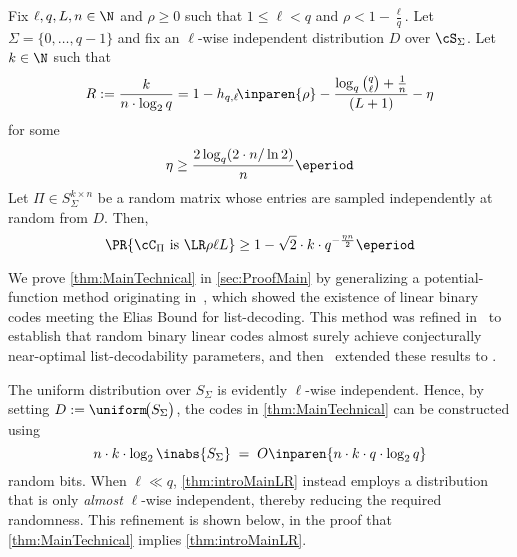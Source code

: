 \documentclass[11pt]{article}
\begin{document}
\begin{theorem}\label{thm:MainTechnical}
    Fix $\ell, q,L, n\in \N$ and $\rho \ge 0$ such that $1\le \ell < q$ and $\rho < 1-\frac \ell q$. Let $\Sigma = \{0,\dots, q-1\}$ and fix an $\ell$-wise independent distribution $D$ over $\cS_\Sigma$. Let $k\in \N$ such that $$R:= \frac{k}{n\cdot \log_2 q} = 1 - h_{q,\ell}\!\inparen{\rho} - \frac {\log_q\binom q \ell+\frac 1n} {(L+1)} - \eta$$ for some \begin{equation}\label{eq:etaLowerBound}
        \eta \ge \frac{2\log_q(2\cdot n/\ln2)}n\eperiod
    \end{equation} Let $\Pi \in S_\Sigma^{k\times n}$ be a random matrix whose entries are sampled independently at random from $D$.    
    Then,
    $$\PR{\cC_\Pi \textrm{ is }\LR \rho \ell L} \ge 1 - \sqrt 2\cdot k\cdot q^{-\frac{\eta n} 2}\eperiod$$
\end{theorem}



We prove \cref{thm:MainTechnical} in \cref{sec:ProofMain} by generalizing a potential-function method originating in~\cite{GHS+2002}, which showed the existence of linear binary codes meeting the Elias Bound for list-decoding. This method was refined in~\cite{LW2021} to establish that random binary linear codes almost surely achieve conjecturally near-optimal list-decodability parameters, and then~\cite{GLM+2022} extended these results to .

The uniform distribution over $S_\Sigma$ is evidently $\ell$-wise independent. Hence, by setting $D := \uniform\!\bigl(S_\Sigma\bigr)$, the codes in \cref{thm:MainTechnical} can be constructed using 
\[
n \cdot k \cdot \log_2 \inabs{S_\Sigma}
\;=\;
O\inparen{n \cdot k \cdot q \cdot \log_2 q}
\]
random bits. When $\ell \ll q$, \cref{thm:introMainLR} instead employs a distribution that is only \emph{almost} $\ell$-wise independent, thereby reducing the required randomness. This refinement is shown below, in the proof that \cref{thm:MainTechnical} implies \cref{thm:introMainLR}.
\end{document}
